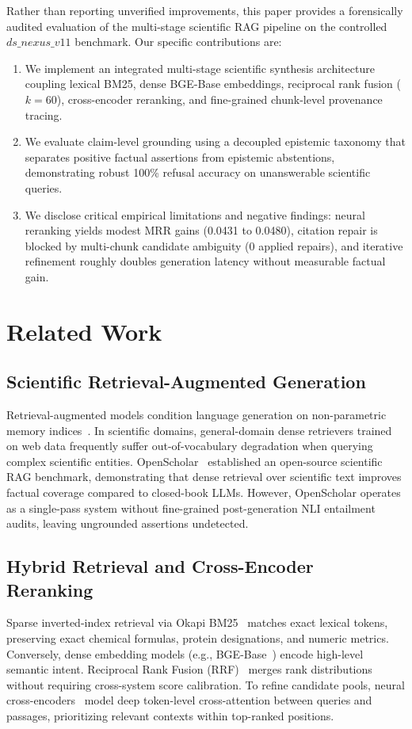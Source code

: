\documentclass[conference]{IEEEtran}
\begin{document}
Rather than reporting unverified improvements, this paper provides a forensically audited evaluation of the multi-stage scientific RAG pipeline on the controlled $ds\_nexus\_v11$ benchmark. Our specific contributions are:
\begin{enumerate}
    \item We implement an integrated multi-stage scientific synthesis architecture coupling lexical BM25, dense BGE-Base embeddings, reciprocal rank fusion ($k=60$), cross-encoder reranking, and fine-grained chunk-level provenance tracing.
    \item We evaluate claim-level grounding using a decoupled epistemic taxonomy that separates positive factual assertions from epistemic abstentions, demonstrating robust 100\% refusal accuracy on unanswerable scientific queries.
    \item We disclose critical empirical limitations and negative findings: neural reranking yields modest MRR gains (0.0431 to 0.0480), citation repair is blocked by multi-chunk candidate ambiguity (0 applied repairs), and iterative refinement roughly doubles generation latency without measurable factual gain.
\end{enumerate}

\section{Related Work}
\subsection{Scientific Retrieval-Augmented Generation}
Retrieval-augmented models condition language generation on non-parametric memory indices~\cite{lewis2020rag}. In scientific domains, general-domain dense retrievers trained on web data frequently suffer out-of-vocabulary degradation when querying complex scientific entities. OpenScholar~\cite{asai2024openscholar} established an open-source scientific RAG benchmark, demonstrating that dense retrieval over scientific text improves factual coverage compared to closed-book LLMs. However, OpenScholar operates as a single-pass system without fine-grained post-generation NLI entailment audits, leaving ungrounded assertions undetected.

\subsection{Hybrid Retrieval and Cross-Encoder Reranking}
Sparse inverted-index retrieval via Okapi BM25~\cite{robertson2009bm25} matches exact lexical tokens, preserving exact chemical formulas, protein designations, and numeric metrics. Conversely, dense embedding models (e.g., BGE-Base~\cite{xiao2023bge}) encode high-level semantic intent. Reciprocal Rank Fusion (RRF)~\cite{cormack2009rrf} merges rank distributions without requiring cross-system score calibration. To refine candidate pools, neural cross-encoders~\cite{reimers2019sentencebert} model deep token-level cross-attention between queries and passages, prioritizing relevant contexts within top-ranked positions.
\end{document}
